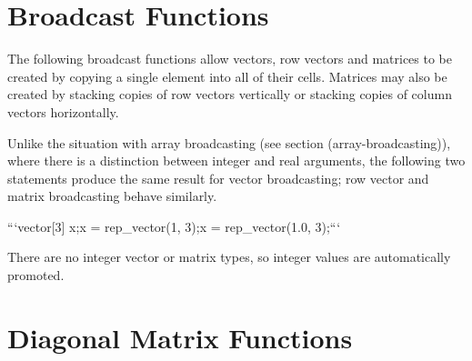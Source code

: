 \begin{description}
{\begin{description}
\section{Broadcast Functions}\label{matrix-broadcast.section}


The following broadcast functions allow vectors, row vectors and matrices to be created by copying a single element into all of their cells.  Matrices may also be created by stacking copies of row vectors vertically or stacking copies of column vectors horizontally.


\begin{description}                \end{description}


Unlike the situation with array broadcasting (see section \@ref(array-broadcasting)), where there is a distinction between integer and real arguments, the following two statements produce the same result for vector broadcasting;  row vector and matrix broadcasting behave similarly.


```\n vector[3] x;\n x = rep_vector(1, 3);\n x = rep_vector(1.0, 3);\n ```


There are no integer vector or matrix types, so integer values are automatically promoted.


\section{Diagonal Matrix Functions}


\begin{description}   \end{description}



\end{description}}
\end{description}
